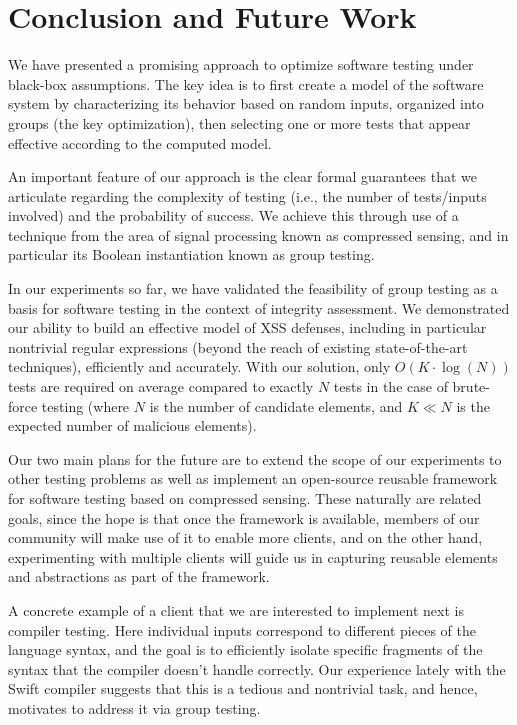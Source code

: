 \section{Conclusion and Future Work}

We have presented a promising approach to optimize software testing under black-box assumptions. The key idea is to first create a model of the software system by characterizing its behavior based on random inputs, organized into groups (the key optimization), then selecting one or more tests that appear effective according to the computed model.

An important feature of our approach is the clear formal guarantees that we articulate regarding the complexity of testing (i.e., the number of tests/inputs involved) and the probability of success. We achieve this through use of a technique from the area of signal processing known as compressed sensing, and in particular its Boolean instantiation known as group testing.

In our experiments so far, we have validated the feasibility of group testing as a basis for software testing in the context of integrity assessment. We demonstrated our ability to build an effective model of XSS defenses, including in particular nontrivial regular expressions (beyond the reach of existing state-of-the-art techniques), efficiently and accurately. With our solution, only $O(K\cdot\log(N))$ tests are required on average compared to exactly $N$ tests in the case of brute-force testing (where $N$ is the number of candidate elements, and $K \ll N$ is the expected number of malicious elements).

Our two main plans for the future are to extend the scope of our experiments to other testing problems as well as implement an open-source reusable framework for software testing based on compressed sensing. These naturally are related goals, since the hope is that once the framework is available, members of our community will make use of it to enable more clients, and on the other hand, experimenting with multiple clients will guide us in capturing reusable elements and abstractions as part of the framework.

A concrete example of a client that we are interested to implement next is compiler testing. Here individual inputs correspond to different pieces of the language syntax, and the goal is to efficiently isolate specific fragments of the syntax that the compiler doesn't handle correctly. Our experience lately with the Swift compiler suggests that this is a tedious and nontrivial task, and hence, motivates to address it via group testing.